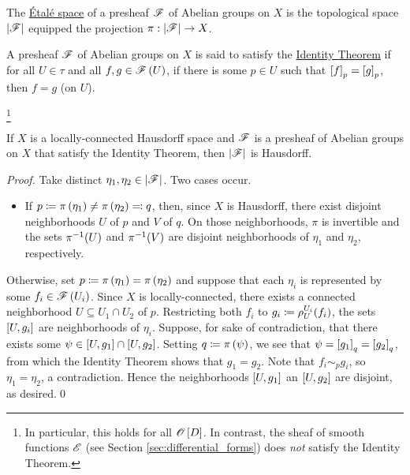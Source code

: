 \documentclass[../Moduli_Spaces_of_Riemann_Surfaces.tex]{subfiles}
\begin{document}
    \begin{definition}
        The \ul{Étalé space} of a presheaf $\mathscr{F}$ of Abelian groups on $X$ is the topological space $\left|\mathscr{F}\right|$ equipped the projection $\pi:\left|\mathscr{F}\right|\to X$.
    \end{definition}
    \begin{definition}
        A presheaf $\mathscr{F}$ of Abelian groups on $X$ is said to satisfy the \ul{Identity Theorem} if for all $U\in\tau$ and all $f,g\in\mathscr{F}\left(U\right)$, if there is some $p\in U$ such that $\left[f\right]_p=\left[g\right]_p$, then $f=g$ (on $U$).
    \end{definition}
    \footnote{In particular, this holds for all $\mathscr{O}\left[D\right]$. In contrast, the sheaf of smooth functions $\mathscr{E}$ (see Section \ref{sec:differential_forms}) does \textit{not} satisfy the Identity Theorem.}
    \begin{proposition}\label{CS:prp:stalk_topology_Hausdorff}
        If $X$ is a locally-connected Hausdorff space and $\mathscr{F}$ is a presheaf of Abelian groups on $X$ that satisfy the Identity Theorem, then $\left|\mathscr{F}\right|$ is Hausdorff.
    \end{proposition}
    \begin{proof}
        Take distinct $\eta_1,\eta_2\in\left|\mathscr{F}\right|$. Two cases occur.
        \begin{itemize}
            \item If $p\coloneqq\pi\left(\eta_1\right)\neq\pi\left(\eta_2\right)\eqqcolon q$, then, since $X$ is Hausdorff, there exist disjoint neighborhoods $U$ of $p$ and $V$ of $q$. On those neighborhoods, $\pi$ is invertible and the sets $\pi^{-1}\!\left(U\right)$ and $\pi^{-1}\!\left(V\right)$ are disjoint neighborhoods of $\eta_1$ and $\eta_2$, respectively.
        \end{itemize}
        Otherwise, set $p\coloneqq\pi\left(\eta_1\right)=\pi\left(\eta_2\right)$ and suppose that each $\eta_i$ is represented by some $f_i\in\mathscr{F}\left(U_i\right)$. Since $X$ is locally-connected, there exists a connected neighborhood $U\subseteq U_1\cap U_2$ of $p$. Restricting both $f_i$ to $g_i\coloneqq\rho^{U_i}_U\!\left(f_i\right)$, the sets $\left[U,g_i\right]$ are neighborhoods of $\eta_i$. Suppose, for sake of contradiction, that there exists some $\psi\in\left[U,g_1\right]\cap\left[U,g_2\right]$. Setting $q\coloneqq\pi\left(\psi\right)$, we see that $\psi=\left[g_1\right]_q=\left[g_2\right]_q$, from which the Identity Theorem shows that $g_1=g_2$. Note that $f_i\sim_pg_i$, so $\eta_1=\eta_2$, a contradiction. Hence the neighborhoods $\left[U,g_1\right]$ an $\left[U,g_2\right]$ are disjoint, as desired.\qed
    \end{proof}
\end{document}
